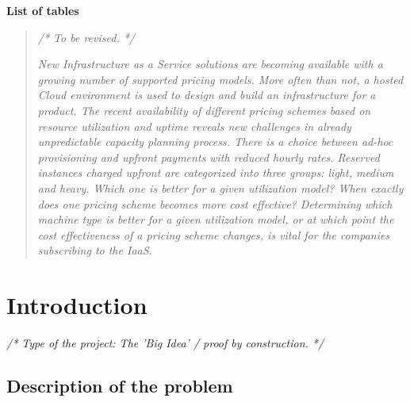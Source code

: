 \documentclass[]{final_report}
\begin{document}
\maketitle
\tableofcontents{}\newpage
\listoffigures\newpage
\par{\textbf{List of tables}}


\begin{abstract}

\emph{ /* To be revised. */} \par
\textsl{New Infrastructure as a Service solutions are becoming available with a growing number of supported pricing models. More often than not, a hosted Cloud environment is used to design and build an infrastructure for a product. The recent availability of different pricing schemes based on resource utilization and uptime reveals new challenges in already unpredictable capacity planning process. There is a choice between ad-hoc provisioning and upfront payments with reduced hourly rates. Reserved instances charged upfront are categorized into three groups: light, medium and heavy. Which one is better for a given utilization model? When exactly does one pricing scheme becomes more cost effective? Determining which machine type is better for a given utilization model, or at which point the cost effectiveness of a pricing scheme changes, is vital for the companies subscribing to the IaaS. }

\end{abstract}
\newpage


\chapter{Introduction}

\emph{ /* Type of the project: The 'Big Idea' / proof by construction. */}

\section{Description of the problem}
\end{document}

